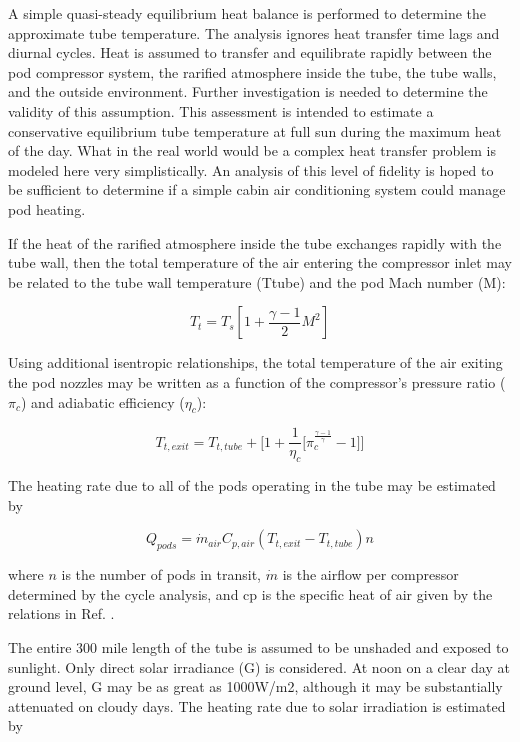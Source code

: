 \documentclass[heading.tex]{subfiles}
\begin{document}
A simple quasi-steady equilibrium heat balance
is performed to determine the approximate tube temperature.
The analysis ignores heat transfer time lags and diurnal cycles.
Heat is assumed to transfer and equilibrate rapidly between the pod compressor system,
the rarified atmosphere inside the tube, the tube walls, and the outside environment.
Further investigation is needed to determine the validity of this assumption.
This assessment is intended to estimate a conservative
equilibrium tube temperature at full sun during the maximum heat of the day.
What in the real world would be a complex heat transfer problem
is modeled here very simplistically.
An analysis of this level of fidelity is hoped to be sufficient to determine if a simple cabin
air conditioning system could manage pod heating.


If the heat of the rarified atmosphere inside the tube exchanges rapidly with the tube wall,
then the total temperature of the air entering the compressor inlet
may be related to the tube wall temperature (Ttube) and the pod Mach number (M):

\begin{equation}
T_{t} = T_{s} [1 + \frac{\gamma -1}{2} M^2]
\end{equation}

Using additional isentropic relationships,
the total temperature of the air exiting the pod nozzles may be written as a function
of the compressor’s pressure ratio ($\pi_{c}$) and adiabatic efficiency ($\eta_{c}$):

\begin{equation}
T_{t,exit} = T_{t,tube} + \Bigg[ 1 + \frac{1}{\eta_{c}} \Big[ \pi_{c}^{\frac{\gamma-1}{\gamma}}- 1 \Big] \Bigg]
\end{equation}

The heating rate due to all of the pods operating in the tube may be estimated by

\begin{equation}
{Q}_{pods}= \dot{m}_{air} C_{p,air} (T_{t,exit} - T_{t,tube}) n
\end{equation}

where $n$ is the number of pods in transit,
$\dot{m}$ is the airflow per compressor determined by the cycle analysis,
and cp is the specific heat of air given by the relations in Ref. \cite{Clausing}. 

The entire 300 mile length of the tube is assumed to be unshaded and exposed to sunlight.
Only direct solar irradiance (G) is considered.
At noon on a clear day at ground level, G may be as great as 1000W/m2,
although it may be substantially attenuated on cloudy days.
The heating rate due to solar irradiation is estimated by
\end{document}
